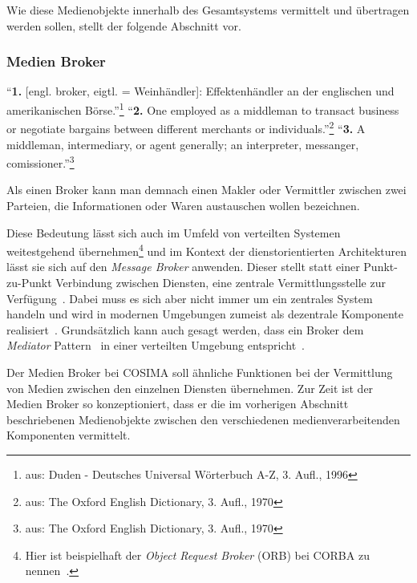   Wie diese Medienobjekte innerhalb des Gesamtsystems vermittelt und übertragen werden sollen, stellt der folgende Abschnitt vor.


\subsubsection{Medien Broker} %
\label{ssub:media_broker}

  \begin{definition}[Broker]\label{def:broker}
    "`\textbf{1.} [engl. broker, eigtl. = Weinhändler]: Effektenhändler an der englischen und amerikanischen Börse."'\footnote{aus: Duden - Deutsches Universal Wörterbuch A-Z, 3. Aufl., 1996} "`\textbf{2.} One employed as a middleman to transact business or negotiate bargains between different merchants or individuals."'\footnote{aus: The Oxford English Dictionary, 3. Aufl., 1970} "`\textbf{3.} A middleman, intermediary, or agent generally; an interpreter, messanger, comissioner."'\footnote{aus: The Oxford English Dictionary, 3. Aufl., 1970}
  \end{definition}

  Als einen Broker kann man demnach einen Makler oder Vermittler zwischen zwei Parteien, die Informationen oder Waren austauschen wollen bezeichnen.

  Diese Bedeutung lässt sich auch im Umfeld von verteilten Systemen weitestgehend übernehmen\footnote{Hier ist beispielhaft der \emph{Object Request Broker} (ORB) bei CORBA zu nennen~\citep{coulouris2001ds,balzert1999lo}.} und im Kontext der dienstorientierten Architekturen lässt sie sich auf den \emph{Message Broker} anwenden. Dieser stellt statt einer Punkt-zu-Punkt Verbindung zwischen Diensten, eine zentrale Vermittlungsstelle zur Verfügung~\citep[S. 71]{web_services}. Dabei muss es sich aber nicht immer um ein zentrales System handeln und wird in modernen Umgebungen zumeist als dezentrale Komponente realisiert~\citep{enterprise_service_bus}. Grundsätzlich kann auch gesagt werden, dass ein Broker dem \emph{Mediator} Pattern~\citep[S. 273]{design_patterns} in einer verteilten Umgebung entspricht~\citep[S. 83]{enterprise_integration_patterns}.
  
  Der Medien Broker bei COSIMA soll ähnliche Funktionen bei der Vermittlung von Medien zwischen den einzelnen Diensten übernehmen. Zur Zeit ist der Medien Broker so konzeptioniert, dass er die im vorherigen Abschnitt beschriebenen Medienobjekte zwischen den verschiedenen medienverarbeitenden Komponenten vermittelt.

